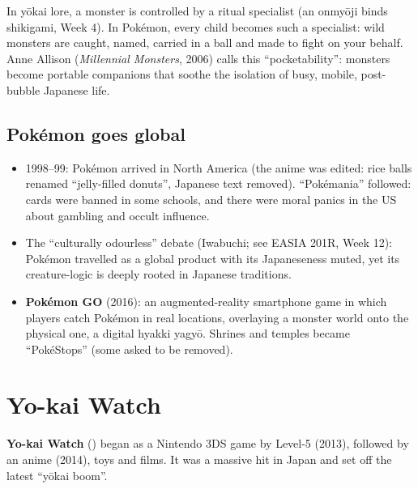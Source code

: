 \begin{example}
In yōkai lore, a monster is controlled by a ritual specialist (an onmyōji binds shikigami,
Week 4). In Pokémon, every child becomes such a specialist: wild monsters are caught,
named, carried in a ball and made to fight on your behalf. Anne Allison (\emph{Millennial
Monsters}, 2006) calls this ``pocketability'': monsters become portable companions that
soothe the isolation of busy, mobile, post-bubble Japanese life.
\end{example}

\subsection{Pokémon goes global}

\begin{itemize}
  \item 1998--99: Pokémon arrived in North America (the anime was edited: rice balls
        renamed ``jelly-filled donuts'', Japanese text removed). ``Pokémania'' followed:
        cards were banned in some schools, and there were moral panics in the US about
        gambling and occult influence.
  \item The ``culturally odourless'' debate (Iwabuchi; see EASIA 201R, Week 12): Pokémon
        travelled as a global product with its Japaneseness muted, yet its creature-logic
        is deeply rooted in Japanese traditions.
  \item \textbf{Pokémon GO} (2016): an augmented-reality smartphone game in which players
        catch Pokémon in real locations, overlaying a monster world onto the physical one, a
        digital hyakki yagyō. Shrines and temples became ``PokéStops'' (some asked to be
        removed).
\end{itemize}

\section{Yo-kai Watch}

\textbf{Yo-kai Watch} () began as a Nintendo 3DS game by Level-5 (2013),
followed by an anime (2014), toys and films. It was a massive hit in Japan and set off the
latest ``yōkai boom''.

